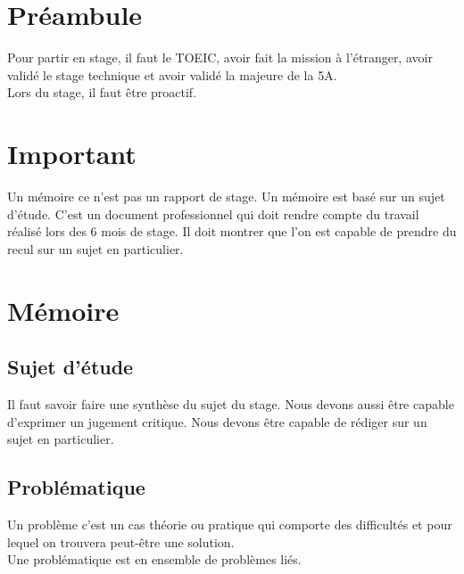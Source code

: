 \section{Préambule}
Pour partir en stage, il faut le TOEIC, avoir fait la mission à l'étranger, avoir validé le stage technique et avoir validé la majeure de la 5A.\\
Lors du stage, il faut être proactif.
\section{Important}
Un mémoire ce n'est pas un rapport de stage. Un mémoire est basé sur un sujet d'étude. C'est un document professionnel qui doit rendre compte du travail réalisé lors des 6 mois de stage. Il doit montrer que l'on est capable de prendre du recul sur un sujet en particulier.
\section{Mémoire}
\subsection{Sujet d'étude}
Il faut savoir faire une synthèse du sujet du stage. Nous devons aussi être capable d'exprimer un jugement critique. Nous devons être capable de rédiger sur un sujet en particulier.
\subsection{Problématique}
Un problème c'est un cas théorie ou pratique qui comporte des difficultés et pour lequel on trouvera peut-être une solution.\\
Une problématique est en ensemble de problèmes liés.